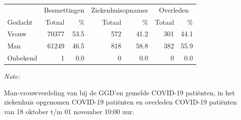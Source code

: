 \documentclass[
  english,
  man,floatsintext]{apa6}
\begin{document}
\begin{table}[H]
\centering\begingroup\fontsize{11}{13}\selectfont

\begin{threeparttable}
\begin{tabular}{lrrrrrr}
\toprule
\multicolumn{1}{c}{ } & \multicolumn{2}{c}{Besmettingen} & \multicolumn{2}{c}{Ziekenhuisopnames} & \multicolumn{2}{c}{Overleden} \\
\cmidrule(l{3pt}r{3pt}){2-3} \cmidrule(l{3pt}r{3pt}){4-5} \cmidrule(l{3pt}r{3pt}){6-7}
Geslacht & Totaal & \% & Totaal & \% & Totaal & \%\\
\midrule
Vrouw & 70377 & 53.5 & 572 & 41.2 & 301 & 44.1\\
Man & 61249 & 46.5 & 818 & 58.8 & 382 & 55.9\\
Onbekend & 1 & 0.0 & 0 & 0.0 & 0 & 0.0\\
\bottomrule
\end{tabular}
\begin{tablenotes}
\item \textit{Note: } 
\item Man-vrouwverdeling van bij de GGD’en gemelde COVID-19 patiënten, in het ziekenhuis opgenomen COVID-19 patiënten en overleden COVID-19 patiënten van 18 oktober t/m 01 november 10:00 uur.
\end{tablenotes}
\end{threeparttable}
\endgroup{}
\end{table}
\newpage
\end{document}
